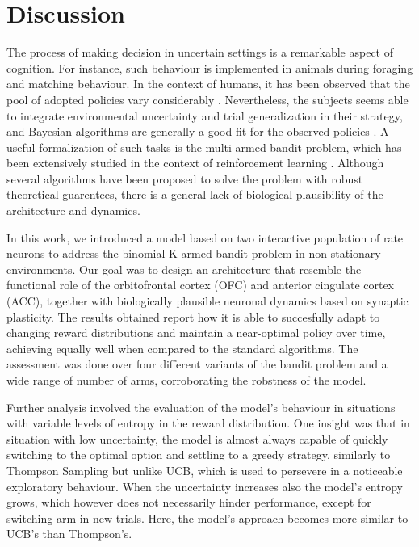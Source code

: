 
\section{Discussion}

The process of making decision in uncertain settings is a remarkable aspect of cognition. For instance, such behaviour is implemented in animals during foraging and matching behaviour.
In the context of humans, it has been observed that the pool of adopted policies vary considerably \cite{steyversBayesianAnalysisHuman2009a}.
Nevertheless, the subjects seems able to integrate environmental uncertainty and trial generalization in their strategy, and Bayesian algorithms are generally a good fit for the observed policies \cite{schulzFindingStructureMultiarmed2020, zhangForgetfulBayesMyopic2013}.
A useful formalization of such tasks is the multi-armed bandit problem, which has been extensively studied in the context of reinforcement learning \cite{suttonReinforcementLearningProblem1998}.
Although several algorithms have been proposed to solve the problem with robust theoretical guarentees, there is a general lack of biological plausibility of the architecture and dynamics.

%
In this work, we introduced a model based on two interactive population of rate neurons to address the binomial K-armed bandit problem in non-stationary environments.
Our goal was to design an architecture that resemble the functional role of the orbitofrontal cortex (OFC) and anterior cingulate cortex (ACC), together with biologically plausible neuronal dynamics based on synaptic plasticity.
The results obtained report how it is able to succesfully adapt to changing reward distributions and maintain a near-optimal policy over time, achieving equally well when compared to the standard algorithms.
The assessment was done over four different variants of the bandit problem and a wide range of number of arms, corroborating the robstness of the model.

Further analysis involved the evaluation of the model's behaviour in situations with variable levels of entropy in the reward distribution.
One insight was that in situation with low uncertainty, the model is almost always capable of quickly switching to the optimal option and settling to a greedy strategy, similarly to Thompson Sampling but unlike UCB, which is used to persevere in a noticeable exploratory behaviour.
When the uncertainty increases also the model's entropy grows, which however does not necessarily hinder performance, except for switching arm in new trials. Here, the model's approach becomes more similar to UCB's than Thompson's.

